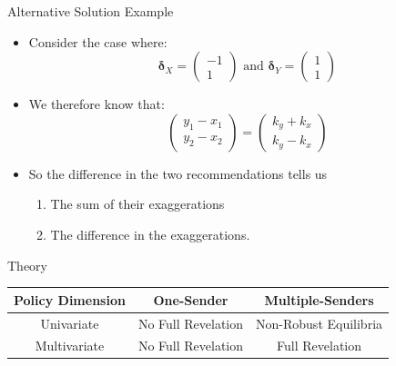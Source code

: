 \documentclass{beamer}
\begin{document}
\begin{frame}{Alternative Solution Example}
	\begin{itemize}
		\item Consider the case where:
		$$\boldsymbol{\delta}_X=\left( \begin{array}{c} -1 \\ 1 \end{array} \right)\text{ and } \boldsymbol{\delta}_Y=\left( \begin{array}{c} 1 \\ 1\end{array}\right)$$\pause
		\item We therefore know that:
		$$\left(\begin{array}{r} y_1-x_1 \\ y_2-x_2 \end{array}\right) =\left(\begin{array}{r} k_y+k_x \\ k_y-k_x \end{array}\right)$$\pause
		\item So the difference in the two recommendations tells us
		\begin{enumerate}
			\item The sum of their exaggerations
			\item The difference in the exaggerations.
		\end{enumerate}
	\end{itemize}
\end{frame}
\begin{frame}{Theory}
	\begin{center}
		\begin{tabular}{ccc} \toprule
		Policy Dimension	&  One-Sender   & Multiple-Senders   \\  \midrule
		Univariate			& No Full Revelation &   Non-Robust Equilibria \\
		Multivariate		&  No Full Revelation &	Full Revelation	\\  \bottomrule
		\end{tabular}
	\end{center}
\end{frame}
\end{document}

